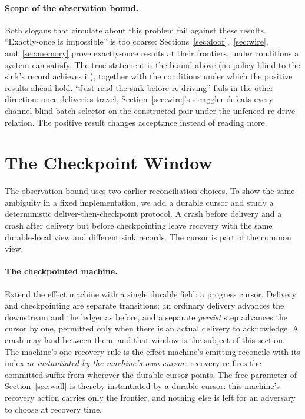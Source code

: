 \documentclass[sigplan,10pt]{acmart}
\theoremstyle{plain}
\theoremstyle{definition}
\begin{document}
\paragraph{Scope of the observation bound.}
Both slogans that circulate about this problem fail against these
results. ``Exactly-once is impossible'' is too coarse:
Sections~\ref{sec:door},~\ref{sec:wire}, and~\ref{sec:memory} prove
exactly-once results at their frontiers, under conditions a system can
satisfy. The true statement is the bound above (no policy
blind to the sink's record achieves it), together with the conditions
under which the positive results ahead hold. ``Just read the sink before
re-driving'' fails in the other direction: once deliveries travel,
Section~\ref{sec:wire}'s straggler defeats every channel-blind batch
selector on the constructed pair under the unfenced re-drive relation.
The positive result changes acceptance instead of reading more.

\section{The Checkpoint Window}\label{sec:checkpoint}

The observation bound uses two earlier reconciliation choices. To show
the same ambiguity in a fixed implementation, we add a durable cursor
and study a deterministic deliver-then-checkpoint protocol. A crash
before delivery and a crash after delivery but before checkpointing
leave recovery with the same durable-local view and different sink
records. The cursor is part of the common view.

\paragraph{The checkpointed machine.}
Extend the effect machine with a single durable field: a progress
cursor. Delivery and checkpointing are separate
transitions: an ordinary delivery advances the downstream and the
ledger as before, and a separate \emph{persist} step advances the
cursor by one, permitted only when there is an actual delivery to
acknowledge. A crash may land between them, and that window is the
subject of this section.
The machine's one recovery rule is the effect machine's emitting
reconcile with its index $m$ \emph{instantiated by the machine's own
cursor}: recovery re-fires the committed suffix from wherever the
durable cursor points. The free parameter of
Section~\ref{sec:wall} is thereby instantiated by a durable cursor:
this machine's recovery action carries only the frontier, and nothing
else is left for an adversary to choose at recovery time.
\end{document}

